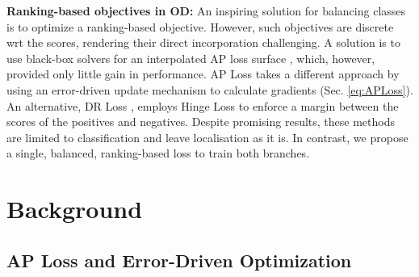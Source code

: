 \documentclass{article}
\begin{document}
\textbf{Ranking-based objectives in OD:} An inspiring solution for balancing classes is to optimize a ranking-based objective. However, such objectives are discrete wrt the scores, rendering their direct incorporation challenging. A solution is to use black-box solvers for an interpolated AP loss surface \cite{BlackboxCombinatorialSolvers}, which, however, provided only little gain in performance. AP Loss \cite{APLoss} takes a different approach by using an error-driven update mechanism to calculate gradients (Sec. \ref{eq:APLoss}). An alternative, DR Loss \cite{DRLoss}, employs Hinge Loss to enforce a margin between the scores of the positives and negatives. Despite promising results, these methods are limited to classification and leave localisation as it is. In contrast, we propose a single, balanced, ranking-based loss  to train both branches.



 \section{Background}
\label{subsec:background}




\subsection{AP Loss and Error-Driven Optimization}
\label{subsec:APLoss}
\end{document}

